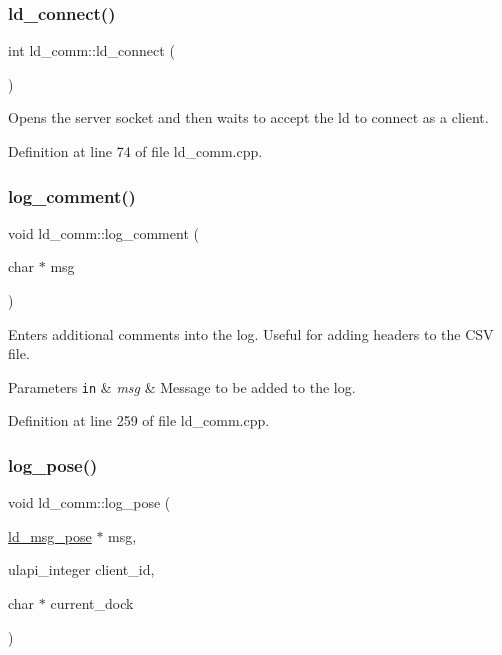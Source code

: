 \subsubsection{\texorpdfstring{ld\+\_\+connect()}{ld\_connect()}}
{\footnotesize\ttfamily int ld\+\_\+comm\+::ld\+\_\+connect (\begin{DoxyParamCaption}{ }\end{DoxyParamCaption})}

Opens the server socket and then waits to accept the ld to connect as a client. 

Definition at line 74 of file ld\+\_\+comm.\+cpp.

\mbox{\label{classld__comm_ad47e957c7397e42e82128ee143d8b143}} 
\subsubsection{\texorpdfstring{log\+\_\+comment()}{log\_comment()}}
{\footnotesize\ttfamily void ld\+\_\+comm\+::log\+\_\+comment (\begin{DoxyParamCaption}\item[{char $\ast$}]{msg }\end{DoxyParamCaption})}

Enters additional comments into the log. Useful for adding headers to the C\+SV file. 
\begin{DoxyParams}[1]{Parameters}
\mbox{\tt in}  & {\em msg} & Message to be added to the log. \\
\hline
\end{DoxyParams}


Definition at line 259 of file ld\+\_\+comm.\+cpp.

\mbox{\label{classld__comm_a4f3f33cd1ad222ab4d0bf8cc114d530b}} 
\subsubsection{\texorpdfstring{log\+\_\+pose()}{log\_pose()}}
{\footnotesize\ttfamily void ld\+\_\+comm\+::log\+\_\+pose (\begin{DoxyParamCaption}\item[{\mbox{\hyperlink{structld__msg__pose}{ld\+\_\+msg\+\_\+pose}} $\ast$}]{msg,  }\item[{ulapi\+\_\+integer}]{client\+\_\+id,  }\item[{char $\ast$}]{current\+\_\+dock }\end{DoxyParamCaption})}

